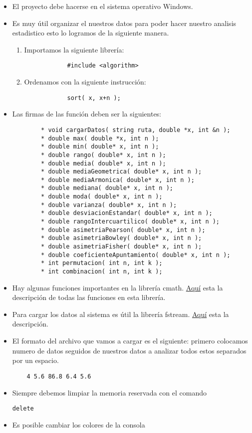 \documentclass[10pt,a4paper]{article}
\begin{document}
\begin{itemize}
	\item El proyecto debe hacerse en el sistema operativo Windows.
	\item Es muy útil organizar el nuestros datos para poder hacer nuestro analisis estadistico esto lo logramos de la siguiente manera.
	\begin{enumerate}
		\item Importamos la siguiente librería:
			\begin{verbatim}
			#include <algorithm> 
			\end{verbatim}
		\item Ordenamos con la siguiente instrucción:
			\begin{verbatim}
			sort( x, x+n );
			\end{verbatim}
	\end{enumerate}
	\item Las firmas de las función deben ser la siguientes:
	\begin{verbatim} 
		* void cargarDatos( string ruta, double *x, int &n );
		* double max( double *x, int n );
		* double min( double* x, int n );
		* double rango( double* x, int n );
		* double media( double* x, int n );
		* double mediaGeometrica( double* x, int n );
		* double mediaArmonica( double* x, int n );
		* double mediana( double* x, int n );
		* double moda( double* x, int n );
		* double varianza( double* x, int n );
		* double desviacionEstandar( double* x, int n );
		* double rangoIntercuartilico( double* x, int n );
		* double asimetriaPearson( double* x, int n );
		* double asimetriaBowley( double* x, int n );
		* double asimetriaFisher( double* x, int n );
		* double coeficienteApuntamiento( double* x, int n );
		* int permutacion( int n, int k );
		* int combinacion( int n, int k );
	\end{verbatim}
	
	\item Hay algunas funciones importantes en la librería cmath. \href{http://www.cplusplus.com/reference/cmath/}{Aquí}
	 esta la descripción de todas las funciones en esta librería.

	\item Para cargar los datos al sistema es útil la librería fstream. \href{http://www.cplusplus.com/reference/fstream/}{Aquí}
	esta la descripción.
	\item El formato del archivo que vamos a cargar es el siguiente: primero colocamos numero de datos seguidos de nuestros datos a analizar todos estos separados por un espacio.
	\begin{flushleft}
	\end{flushleft}
	\begin{verbatim}
	4 5.6 86.8 6.4 5.6
	\end{verbatim}
	\item Siempre debemos limpiar la memoria reservada con el comando \begin{verbatim}delete\end{verbatim}
	\item Es posible cambiar los colores de la consola
\end{itemize}
	
\end{document}
